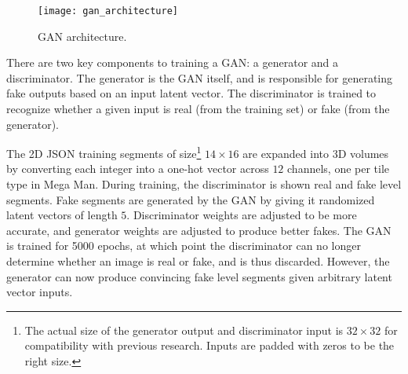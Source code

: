 \begin{figure}[t]
\centering
\texttt{[image: gan\_architecture]}
\caption{GAN architecture.}
\label{fig:architecture}
\end{figure}


There are two key components to training a GAN: a generator and a discriminator. The generator is the GAN itself, and is responsible for generating fake outputs based on an input latent vector. The discriminator is trained to recognize whether a given input is real (from the training set) or fake (from the generator). 

The 2D JSON training segments of size\footnote{The actual size of the generator output and discriminator input is $32 \times 32$ for compatibility with previous research. Inputs are padded with zeros to be the right size.} $14 \times 16$ are expanded into 3D volumes by converting each integer into a one-hot vector across $12$ channels, one per tile type in Mega Man. During training, the discriminator is shown real and fake level segments. 
Fake segments are generated by the GAN by giving it
randomized latent vectors of length $5$.
Discriminator weights are adjusted to be more accurate, and generator weights are adjusted to produce better fakes.
The GAN is trained for 5000 epochs, at which point the discriminator can no longer determine whether an image is real or fake, and is thus discarded.
However, the generator can now produce convincing fake level segments
given arbitrary latent vector inputs.












